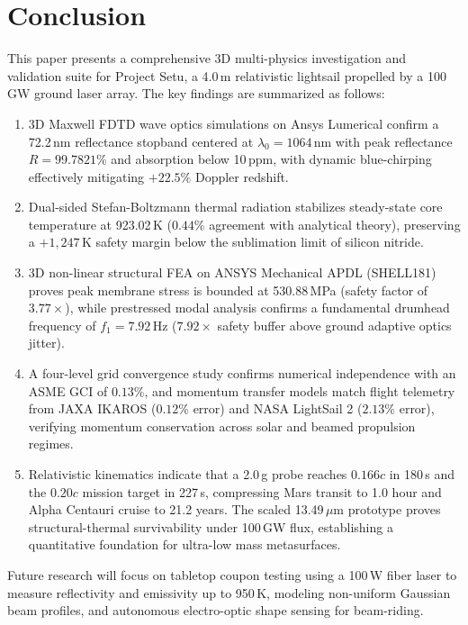 \documentclass[aps,prd,reprint,superscriptaddress,nofootinbib,floatfix]{revtex4-2}
\begin{document}
\section{Conclusion}
\label{sec:conclusion}
This paper presents a comprehensive 3D multi-physics investigation and validation suite for Project Setu, a 4.0\,m relativistic lightsail propelled by a 100\,GW ground laser array. The key findings are summarized as follows:

\begin{enumerate}
\setlength{\itemsep}{-2.5pt plus 0.2pt}
\setlength{\parskip}{0pt}
\item 3D Maxwell FDTD wave optics simulations on Ansys Lumerical confirm a 72.2\,nm reflectance stopband centered at $\lambda_0=1064\,\mathrm{nm}$ with peak reflectance $R=99.7821\%$ and absorption below 10\,ppm, with dynamic blue-chirping effectively mitigating $+22.5\%$ Doppler redshift.
\item Dual-sided Stefan-Boltzmann thermal radiation stabilizes steady-state core temperature at 923.02\,K ($0.44\%$ agreement with analytical theory), preserving a $+1,247$\,K safety margin below the sublimation limit of silicon nitride.
\item 3D non-linear structural FEA on ANSYS Mechanical APDL (SHELL181) proves peak membrane stress is bounded at 530.88\,MPa (safety factor of $3.77\times$), while prestressed modal analysis confirms a fundamental drumhead frequency of $f_1=7.92$\,Hz ($7.92\times$ safety buffer above ground adaptive optics jitter).
\item A four-level grid convergence study confirms numerical independence with an ASME GCI of $0.13\%$, and momentum transfer models match flight telemetry from JAXA IKAROS ($0.12\%$ error) and NASA LightSail 2 ($2.13\%$ error), verifying momentum conservation across solar and beamed propulsion regimes.
\item Relativistic kinematics indicate that a 2.0\,g probe reaches $0.166c$ in 180\,s and the $0.20c$ mission target in 227\,s, compressing Mars transit to 1.0 hour and Alpha Centauri cruise to 21.2 years. The scaled 13.49\,$\mu\mathrm{m}$ prototype proves structural-thermal survivability under 100\,GW flux, establishing a quantitative foundation for ultra-low mass metasurfaces.
\end{enumerate}

Future research will focus on tabletop coupon testing using a 100\,W fiber laser to measure reflectivity and emissivity up to 950\,K, modeling non-uniform Gaussian beam profiles, and autonomous electro-optic shape sensing for beam-riding.
\end{document}

